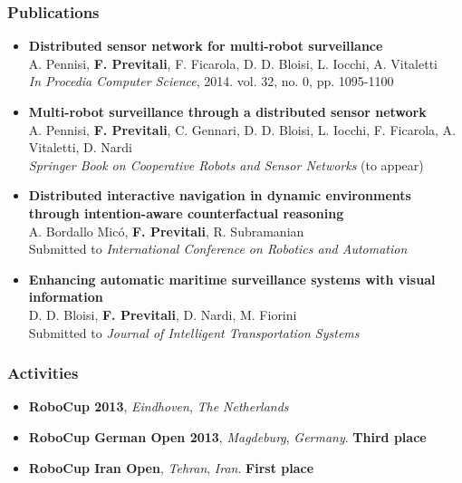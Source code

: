 \begin{frame}
	\frametitle{Publications}
	
	\small
	
	\begin{itemize}
		\item \textbf{Distributed sensor network for multi-robot surveillance} \\
			  A. Pennisi, \textbf{F. Previtali}, F. Ficarola, D. D. Bloisi, L. Iocchi, A. Vitaletti \\
			  \emph{In Procedia Computer Science}, 2014. vol. 32, no. 0, pp. 1095-1100	
		\item \textbf{Multi-robot surveillance through a distributed sensor network} \\
			  A. Pennisi, \textbf{F. Previtali}, C. Gennari, D. D. Bloisi, L. Iocchi, F. Ficarola, A. Vitaletti,
			  D. Nardi \\
			  \emph{Springer Book on Cooperative Robots and Sensor Networks} (to appear)
		\item \textbf{Distributed interactive navigation in dynamic environments through intention-aware
			  counterfactual reasoning} \\
			  A. Bordallo Mic\'o, \textbf{F. Previtali}, R. Subramanian \\
			  Submitted to \emph{International Conference on Robotics and Automation}
		\item \textbf{Enhancing automatic maritime surveillance systems with visual information} \\
			  D. D. Bloisi, \textbf{F. Previtali}, D. Nardi, M. Fiorini \\
			  Submitted to \emph{Journal of Intelligent Transportation Systems}
	\end{itemize}
\end{frame}

\begin{frame}
	\frametitle{Activities}
	
	\begin{center}
	\end{center}
	
	\begin{itemize}
		\item \textbf{RoboCup 2013}, \emph{Eindhoven}, \emph{The Netherlands}
		\item \textbf{RoboCup German Open 2013}, \emph{Magdeburg}, \emph{Germany}. \textbf{Third place}
		\item \textbf{RoboCup Iran Open}, \emph{Tehran}, \emph{Iran}. \textbf{First place}
	\end{itemize}
\end{frame}
